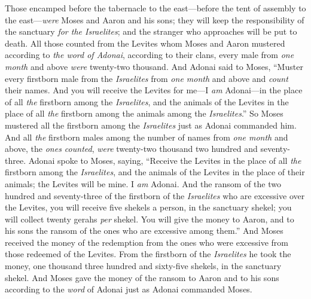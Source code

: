 \begin{biblechapter}
\verse Those encamped before the tabernacle to the east—before the tent of assembly to the east—\textit{were} Moses and Aaron and his sons; they will keep the responsibility of the sanctuary \textit{for the Israelites}; and the stranger who approaches will be put to death.
\verse All those counted from the Levites whom Moses and Aaron mustered according to \textit{the word of Adonai}, according to their clans, every male from \textit{one month} and above \textit{were} twenty-two thousand.
\verse And Adonai said to Moses, “Muster every firstborn male from the \textit{Israelites} from \textit{one month} and above and \textit{count} their names.
\verse And you will receive the Levites for me—I \textit{am} Adonai—in the place of all \textit{the} firstborn among the \textit{Israelites}, and the animals of the Levites in the place of all \textit{the} firstborn among the animals among the \textit{Israelites}.”
\verse So Moses mustered all the firstborn among the \textit{Israelites} just as Adonai commanded him.
\verse And all \textit{the} firstborn males among the number of names from \textit{one month} and above, the \textit{ones counted}, \textit{were} twenty-two thousand two hundred and seventy-three.
\verse Adonai spoke to Moses, saying,
\verse “Receive the Levites in the place of all \textit{the} firstborn among the \textit{Israelites}, and the animals of the Levites in the place of their animals; the Levites will be mine. I \textit{am} Adonai.
\verse And the ransom of the two hundred and seventy-three of the firstborn of the \textit{Israelites} who are excessive over the Levites,
\verse you will receive five shekels a person, in the sanctuary shekel; you will collect twenty gerahs \textit{per} shekel.
\verse You will give the money to Aaron, and to his sons the ransom of the ones who are excessive among them.”
\verse And Moses received the money of the redemption from the ones who were excessive from those redeemed of the Levites.
\verse From the firstborn of the \textit{Israelites} he took the money, one thousand three hundred and sixty-five shekels, in the sanctuary shekel.
\verse And Moses gave the money of the ransom to Aaron and to his sons according to the \textit{word} of Adonai just as Adonai commanded Moses.
\end{biblechapter}

